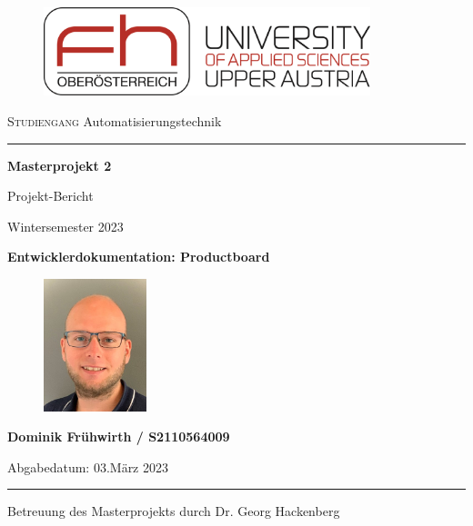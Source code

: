 \begin{titlepage}
	\vspace*{-17mm}

	\begin{center}
		\begin{figure}[h]
			\centering
			\includegraphics[width=9.5cm]{Grafik/FH.png}
		\end{figure}
		
		\vspace{6mm}
	  	{\textsc{\Large Studiengang}}
		\vskip 2mm
	  	{\Large Automatisierungstechnik}
		\vskip 0mm
		\rule{15cm}{0.3mm}


        \vskip 7mm
        \textbf{\large Masterprojekt 2}
        
		\vskip 0mm
		Projekt-Bericht

		\vskip 0mm
        Wintersemester 2023

		\vskip 10mm
		\textbf{\LARGE{Entwicklerdokumentation: Productboard}}

		\vskip 8mm
        \begin{figure}[h]
			\centering
			\includegraphics[width=3cm]{Grafik/userPic.jpg}
		\end{figure}
		
		\vskip 5mm
        \textbf{\large {Dominik Frühwirth / S2110564009}}
        
		
        \vskip 6mm
        Abgabedatum:
        \vskip 0mm
	  	03.März 2023
	  

	  	\vspace{5mm}
	  	\rule{15cm}{0.3mm}
	  	\vskip 5mm
	  	Betreuung des Masterprojekts durch
	  	\vskip 0mm
        Dr. Georg Hackenberg
		
	\end{center}
\end{titlepage}